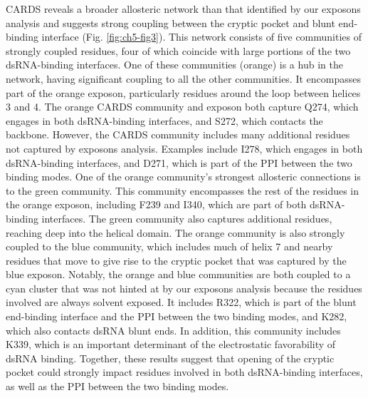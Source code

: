 \documentclass[../main.tex]{subfiles}
\begin{document}
        CARDS reveals a broader allosteric network than that identified by our exposons analysis and suggests strong coupling between the cryptic pocket and blunt end-binding interface (Fig. \ref{fig:ch5-fig3}). This network consists of five communities of strongly coupled residues, four of which coincide with large portions of the two dsRNA-binding interfaces. One of these communities (orange) is a hub in the network, having significant coupling to all the other communities. It encompasses part of the orange exposon, particularly residues around the loop between helices 3 and 4. The orange CARDS community and exposon both capture Q274, which engages in both dsRNA-binding interfaces, and S272, which contacts the backbone\cite{leung_structural_2010}. However, the CARDS community includes many additional residues not captured by exposons analysis. Examples include I278, which engages in both dsRNA-binding interfaces, and D271, which is part of the PPI between the two binding modes\cite{leung_structural_2010}. One of the orange community’s strongest allosteric connections is to the green community. This community encompasses the rest of the residues in the orange exposon, including F239 and I340, which are part of both dsRNA-binding interfaces\cite{leung_structural_2010}. The green community also captures additional residues, reaching deep into the helical domain. The orange community is also strongly coupled to the blue community, which includes much of helix 7 and nearby residues that move to give rise to the cryptic pocket that was captured by the blue exposon. Notably, the orange and blue communities are both coupled to a cyan cluster that was not hinted at by our exposons analysis because the residues involved are always solvent exposed. It includes R322, which is part of the blunt end-binding interface and the PPI between the two binding modes, and K282, which also contacts dsRNA blunt ends\cite{leung_structural_2010}. In addition, this community includes K339, which is an important determinant of the electrostatic favorability of dsRNA binding\cite{leung_structural_2010}. Together, these results suggest that opening of the cryptic pocket could strongly impact residues involved in both dsRNA-binding interfaces, as well as the PPI between the two binding modes.
\end{document}
